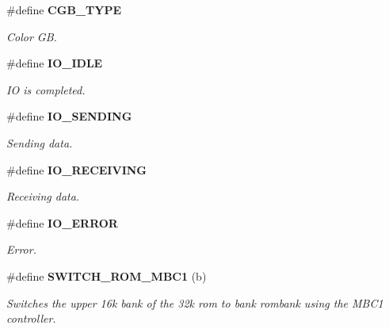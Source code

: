 \begin{CompactItemize}
\item 
\label{gb.h_a30}
\#define {\bf CGB\_\-TYPE}
\begin{CompactList}\small\item\em Color GB.\item\end{CompactList}

\item 
\label{gb.h_a31}
\#define {\bf IO\_\-IDLE}
\begin{CompactList}\small\item\em IO is completed.\item\end{CompactList}

\item 
\label{gb.h_a32}
\#define {\bf IO\_\-SENDING}
\begin{CompactList}\small\item\em Sending data.\item\end{CompactList}

\item 
\label{gb.h_a33}
\#define {\bf IO\_\-RECEIVING}
\begin{CompactList}\small\item\em Receiving data.\item\end{CompactList}

\item 
\label{gb.h_a34}
\#define {\bf IO\_\-ERROR}
\begin{CompactList}\small\item\em Error.\item\end{CompactList}

\item 
\#define {\bf SWITCH\_\-ROM\_\-MBC1} (b) 
\begin{CompactList}\small\item\em Switches the upper 16k bank of the 32k rom to bank rombank using the MBC1 controller.\item\end{CompactList}


\end{CompactItemize}
